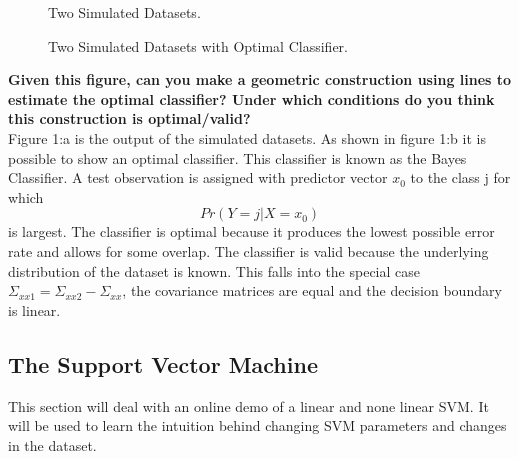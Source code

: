 \documentclass[11pt,oneside,a4paper]{article}
\begin{document}
\begin{figure}[H]
{	}%
	\fi
	\noindent
	\parbox{.45\textwidth}{%
		\centering
		\caption{Two Simulated Datasets.}
	}%
	\hfil
	\parbox{.45\textwidth}{%
		\centering
		\caption{Two Simulated Datasets with Optimal Classifier.}
	}%
\end{figure}




\textbf{Given this figure, can you make a geometric construction using lines to estimate the optimal classifier? Under which conditions do you think this construction is optimal/valid?}\\

Figure 1:a is the output of the simulated datasets. As shown in figure 1:b it is possible to show an optimal classifier. This classifier is known as the Bayes Classifier. A test observation is assigned with predictor vector $x_{0}$ to the class j for which    \[ Pr(Y=j|X=x_{0}) \] is largest. The classifier is optimal because it produces the lowest possible error rate and allows for some overlap. The classifier is valid because the underlying distribution of the dataset is known. This falls into the special case $\Sigma_{xx1} = \Sigma_{xx2} - \Sigma_{xx}$, the covariance matrices are equal and the decision boundary is linear.
\subsection{The Support Vector Machine}

This section will deal with an online demo of a linear and none linear SVM. It will be used to learn the intuition behind changing SVM parameters and changes in the dataset.\\
\end{document}
